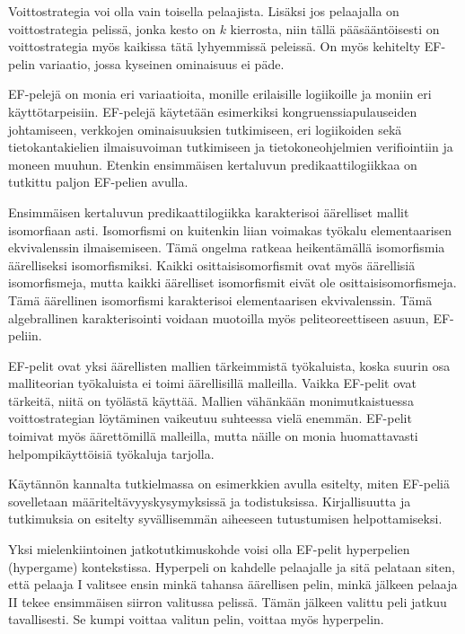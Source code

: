 \documentclass[finnish]{tktltiki2}
\theoremstyle{definition}
\theoremstyle{remark}
\begin{document}
Voittostrategia voi olla vain toisella pelaajista. Lisäksi jos pelaajalla on voittostrategia pelissä, jonka kesto on $k$ kierrosta, niin tällä pääsääntöisesti on voittostrategia myös kaikissa tätä lyhyemmissä peleissä. On myös kehitelty EF-pelin variaatio, jossa kyseinen ominaisuus ei päde.

EF-pelejä on monia eri variaatioita, monille erilaisille logiikoille ja moniin eri käyttötarpeisiin. EF-pelejä käytetään esimerkiksi kongruenssiapulauseiden johtamiseen, verkkojen ominaisuuksien tutkimiseen, eri logiikoiden sekä tietokantakielien ilmaisuvoiman tutkimiseen ja tietokoneohjelmien verifiointiin ja moneen muuhun. Etenkin ensimmäisen kertaluvun predikaattilogiikkaa on tutkittu paljon EF-pelien avulla.

Ensimmäisen kertaluvun predikaattilogiikka karakterisoi äärelliset mallit isomorfiaan asti. Isomorfismi on kuitenkin liian voimakas työkalu elementaarisen ekvivalenssin ilmaisemiseen. Tämä ongelma ratkeaa heikentämällä isomorfismia äärelliseksi isomorfismiksi. Kaikki osittaisisomorfismit ovat myös äärellisiä isomorfismeja, mutta kaikki äärelliset isomorfismit eivät ole osittaisisomorfismeja. Tämä äärellinen isomorfismi karakterisoi elementaarisen ekvivalenssin. Tämä algebrallinen karakterisointi voidaan muotoilla myös peliteoreettiseen asuun, EF-peliin.

EF-pelit ovat yksi äärellisten mallien tärkeimmistä työkaluista, koska suurin osa malliteorian työkaluista ei toimi äärellisillä malleilla. Vaikka EF-pelit ovat tärkeitä, niitä on työlästä käyttää. Mallien vähänkään monimutkaistuessa voittostrategian löytäminen vaikeutuu suhteessa vielä enemmän. EF-pelit toimivat myös äärettömillä malleilla, mutta näille on monia huomattavasti helpompikäyttöisiä työkaluja tarjolla.

Käytännön kannalta tutkielmassa on esimerkkien avulla esitelty, miten EF-peliä sovelletaan määriteltävyyskysymyksissä ja todistuksissa. Kirjallisuutta ja tutkimuksia on esitelty syvällisemmän aiheeseen tutustumisen helpottamiseksi.

Yksi mielenkiintoinen jatkotutkimuskohde voisi olla EF-pelit hyperpelien (hypergame) kontekstissa. Hyperpeli on kahdelle pelaajalle ja sitä pelataan siten, että pelaaja I valitsee ensin minkä tahansa äärellisen pelin, minkä jälkeen pelaaja II tekee ensimmäisen siirron valitussa pelissä. Tämän jälkeen valittu peli jatkuu tavallisesti. Se kumpi voittaa valitun pelin, voittaa myös hyperpelin.
\end{document}
